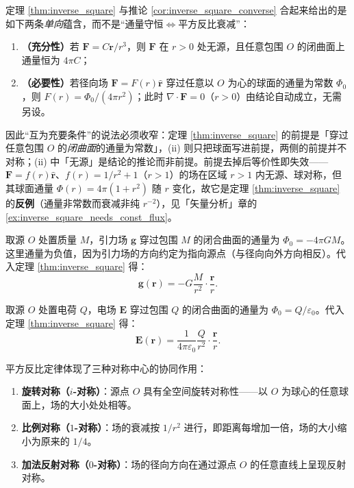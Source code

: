 \begin{remark}\label{rem:inverse_square_converse_scope}
定理 \ref{thm:inverse_square} 与推论 \ref{cor:inverse_square_converse} 合起来给出的是如下两条\emph{单向}蕴含，而不是“通量守恒$\iff$平方反比衰减”：
\begin{enumerate}[label=(\roman*)]
    \item \textbf{（充分性）}若 $\mathbf{F}=C\mathbf{r}/r^3$，则 $\mathbf F$ 在 $r>0$ 处无源，且任意包围 $O$ 的闭曲面上通量恒为 $4\pi C$；
    \item \textbf{（必要性）}若径向场 $\mathbf{F}=F(r)\hat{\mathbf{r}}$ 穿过任意以 $O$ 为心的球面的通量为常数 $\Phi_0$，则 $F(r)=\Phi_0/(4\pi r^2)$；此时 $\nabla\cdot\mathbf F=0$（$r>0$）由结论自动成立，无需另设。
\end{enumerate}
因此“互为充要条件”的说法必须收窄：定理 \ref{thm:inverse_square} 的前提是「穿过任意包围 $O$ 的\emph{闭曲面}的通量为常数」，(ii) 则只把球面写进前提，两侧的前提并不对称；(ii) 中「无源」是结论的推论而非前提。前提去掉后等价性即失效——$\mathbf F=f(r)\hat{\mathbf r}$、$f(r)=1/r^2+1$（$r>1$）的场在区域 $r>1$ 内无源、球对称，但其球面通量 $\Phi(r)=4\pi(1+r^2)$ 随 $r$ 变化，故它是定理 \ref{thm:inverse_square} 的\textbf{反例}（通量非常数而衰减非纯 $r^{-2}$），见「矢量分析」章的 \cref{ex:inverse_square_needs_const_flux}。
\end{remark}

\begin{example}[牛顿万有引力定律]
取源 $O$ 处置质量 $M$，引力场 $\mathbf{g}$ 穿过包围 $M$ 的闭合曲面的通量为 $\Phi_0 = -4\pi GM$。这里通量为负值，因为引力场的方向约定为指向源点（与径向向外方向相反）。代入定理 \ref{thm:inverse_square} 得：
\[\mathbf{g}(\mathbf{r}) = -G \frac{M}{r^2} \cdot \frac{\mathbf{r}}{r}.\]
\end{example}

\begin{example}[库仑定律]
取源 $O$ 处置电荷 $Q$，电场 $\mathbf{E}$ 穿过包围 $Q$ 的闭合曲面的通量为 $\Phi_0 = Q/\varepsilon_0$。代入定理 \ref{thm:inverse_square} 得：
\[\mathbf{E}(\mathbf{r}) = \frac{1}{4\pi\varepsilon_0} \frac{Q}{r^2} \cdot \frac{\mathbf{r}}{r}.\]
\end{example}

\begin{remark}[平方反比定律与三种对称中心]\label{rem:inverse_square_three_symmetries}
平方反比定律体现了三种对称中心的协同作用：
\begin{enumerate}[label=(\roman*)]
    \item \textbf{旋转对称（$i$-对称）}：源点 $O$ 具有全空间旋转对称性——以 $O$ 为球心的任意球面上，场的大小处处相等。
    \item \textbf{比例对称（$1$-对称）}：场的衰减按 $1/r^2$ 进行，即距离每增加一倍，场的大小缩小为原来的 $1/4$。
    \item \textbf{加法反射对称（$0$-对称）}：场的径向方向在通过源点 $O$ 的任意直线上呈现反射对称。
\end{enumerate}
\end{remark}

